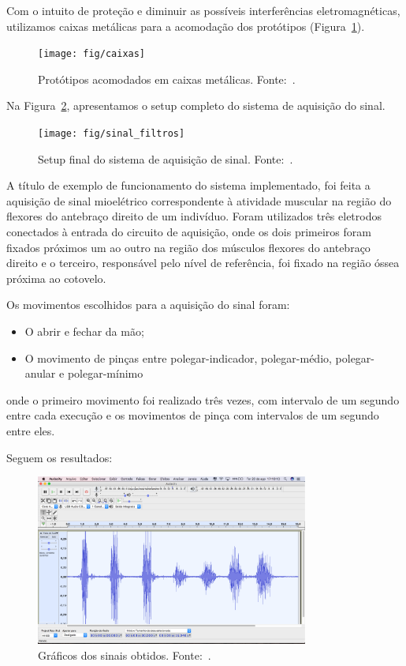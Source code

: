 \documentclass[a4paper,11pt]{article}
\begin{document}
Com o intuito de proteção e diminuir as possíveis interferências eletromagnéticas, utilizamos caixas metálicas para a acomodação dos protótipos (Figura~\ref{fig:s0_filtros}).
	\begin{figure} [h]
		\centering
		\texttt{[image: fig/caixas]}
		\caption{Protótipos acomodados em caixas metálicas. Fonte:~\parencite{limajr2019}.}
		\label{fig:s0_filtros}
	\end{figure}

Na Figura~\ref{fig:sinal_filtros}, apresentamos o setup completo do sistema de aquisição do sinal.

	\begin{figure}[h]
		\centering
		\texttt{[image: fig/sinal\_filtros]}
		\caption{Setup final do sistema de aquisição de sinal. Fonte:~\parencite{limajr2019}.}
		\label{fig:sinal_filtros}
	\end{figure}

A título de exemplo de funcionamento do sistema implementado, foi feita a aquisição de sinal mioelétrico correspondente à atividade muscular na região do flexores do antebraço direito de um indivíduo. Foram utilizados três eletrodos conectados à entrada do circuito de aquisição, onde os dois primeiros foram fixados próximos um ao outro na região dos músculos flexores do antebraço direito e o terceiro, responsável pelo nível de referência, foi fixado na região óssea próxima ao cotovelo.

Os movimentos escolhidos para a aquisição do sinal foram:
	\begin{itemize}
		\item O abrir e fechar da mão;
		\item O movimento de pinças entre polegar-indicador, polegar-médio, polegar-anular e polegar-mínimo
	\end{itemize}
onde o primeiro movimento foi realizado três vezes, com intervalo de um segundo entre cada execução e os movimentos de pinça com intervalos de um segundo entre eles.

Seguem os resultados:
	\begin{figure}[h]
		\centering
		\includegraphics[width=0.8\textwidth]{fig/captura_filtros}
		\caption{Gráficos dos sinais obtidos. Fonte:~\parencite{limajr2019}.}
		\label{fig:captura_ret}
	\end{figure}
	
 
\printbibliography
\end{document}
